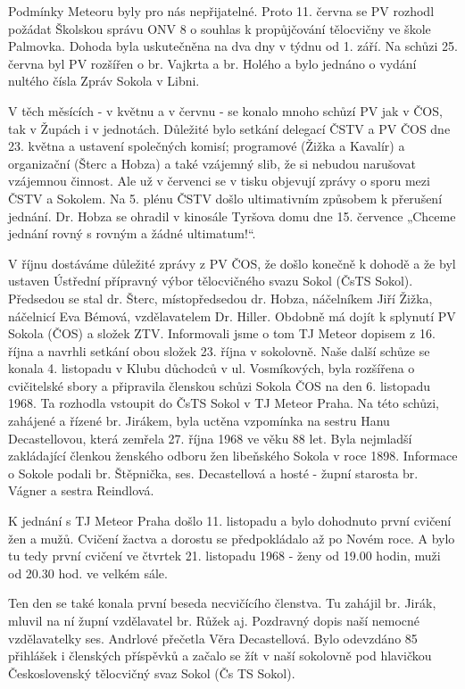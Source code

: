 Podmínky Meteoru byly pro nás nepřijatelné. Proto 11. června se PV
rozhodl požádat Školskou správu ONV 8 o souhlas k propůjčování
tělocvičny ve škole Palmovka. Dohoda byla uskutečněna na dva dny v týdnu
od 1. září. Na schůzi 25. června byl PV rozšířen o br. Vajkrta a br.
Holého a bylo jednáno o vydání nultého čísla Zpráv Sokola v Libni.

V těch měsících - v květnu a v červnu - se konalo mnoho schůzí PV jak v
ČOS, tak v Župách i v jednotách. Důležité bylo setkání delegací ČSTV a
PV ČOS dne 23. května a ustavení společných komisí; programové (Žižka a
Kavalír) a organizační (Šterc a Hobza) a také vzájemný slib, že si
nebudou narušovat vzájemnou činnost. Ale už v červenci se v tisku
objevují zprávy o sporu mezi ČSTV a Sokolem. Na 5. plénu ČSTV došlo
ultimativním způsobem k přerušení jednání. Dr. Hobza se ohradil v
kinosále Tyršova domu dne 15. července „Chceme jednání rovný s rovným a
žádné ultimatum!{}``.

V říjnu dostáváme důležité zprávy z PV ČOS, že došlo konečně k dohodě a
že byl ustaven Ústřední přípravný výbor tělocvičného svazu Sokol (ČsTS
Sokol). Předsedou se stal dr. Šterc, místopředsedou dr. Hobza,
náčelníkem Jiří Žižka, náčelnicí Eva Bémová, vzdělavatelem Dr. Hiller.
Obdobně má dojít k splynutí PV Sokola (ČOS) a složek ZTV. Informovali
jsme o tom TJ Meteor dopisem z 16. října a navrhli setkání obou složek
23. října v sokolovně. Naše další schůze se konala 4. listopadu v Klubu
důchodců v ul. Vosmíkových, byla rozšířena o cvičitelské sbory a
připravila členskou schůzi Sokola ČOS na den 6. listopadu 1968. Ta
rozhodla vstoupit do ČsTS Sokol v TJ Meteor Praha. Na této schůzi,
zahájené a řízené br. Jirákem, byla uctěna vzpomínka na sestru Hanu
Decastellovou, která zemřela 27. října 1968 ve věku 88 let. Byla
nejmladší zakládající členkou ženského odboru žen libeňského Sokola v
roce 1898. Informace o Sokole podali br. Štěpnička, ses. Decastellová a
hosté - župní starosta br. Vágner a sestra Reindlová.

K jednání s TJ Meteor Praha došlo 11. listopadu a bylo dohodnuto první
cvičení žen a mužů. Cvičení žactva a dorostu se předpokládalo až po
Novém roce. A bylo tu tedy první cvičení ve čtvrtek 21. listopadu 1968 -
ženy od 19.00 hodin, muži od 20.30 hod. ve velkém sále.

Ten den se také konala první beseda necvičícího členstva. Tu zahájil br.
Jirák, mluvil na ní župní vzdělavatel br. Růžek aj. Pozdravný dopis naší
nemocné vzdělavatelky ses. Andrlové přečetla Věra Decastellová. Bylo
odevzdáno 85 přihlášek i členských příspěvků a začalo se žít v naší
sokolovně pod hlavičkou Československý tělocvičný svaz Sokol (Čs TS
Sokol).

